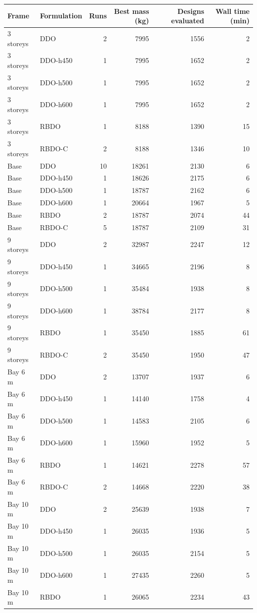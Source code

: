 \begin{tabular}{llrrrr}
\toprule
Frame & Formulation & Runs & Best mass (kg) & Designs evaluated & Wall time (min) \\
\midrule
3 storeys & DDO & 2 & 7995 & 1556 & 2 \\
3 storeys & DDO-h450 & 1 & 7995 & 1652 & 2 \\
3 storeys & DDO-h500 & 1 & 7995 & 1652 & 2 \\
3 storeys & DDO-h600 & 1 & 7995 & 1652 & 2 \\
3 storeys & RBDO & 1 & 8188 & 1390 & 15 \\
3 storeys & RBDO-C & 2 & 8188 & 1346 & 10 \\
Base & DDO & 10 & 18261 & 2130 & 6 \\
Base & DDO-h450 & 1 & 18626 & 2175 & 6 \\
Base & DDO-h500 & 1 & 18787 & 2162 & 6 \\
Base & DDO-h600 & 1 & 20664 & 1967 & 5 \\
Base & RBDO & 2 & 18787 & 2074 & 44 \\
Base & RBDO-C & 5 & 18787 & 2109 & 31 \\
9 storeys & DDO & 2 & 32987 & 2247 & 12 \\
9 storeys & DDO-h450 & 1 & 34665 & 2196 & 8 \\
9 storeys & DDO-h500 & 1 & 35484 & 1938 & 8 \\
9 storeys & DDO-h600 & 1 & 38784 & 2177 & 8 \\
9 storeys & RBDO & 1 & 35450 & 1885 & 61 \\
9 storeys & RBDO-C & 2 & 35450 & 1950 & 47 \\
Bay 6 m & DDO & 2 & 13707 & 1937 & 6 \\
Bay 6 m & DDO-h450 & 1 & 14140 & 1758 & 4 \\
Bay 6 m & DDO-h500 & 1 & 14583 & 2105 & 6 \\
Bay 6 m & DDO-h600 & 1 & 15960 & 1952 & 5 \\
Bay 6 m & RBDO & 1 & 14621 & 2278 & 57 \\
Bay 6 m & RBDO-C & 2 & 14668 & 2220 & 38 \\
Bay 10 m & DDO & 2 & 25639 & 1938 & 7 \\
Bay 10 m & DDO-h450 & 1 & 26035 & 1936 & 5 \\
Bay 10 m & DDO-h500 & 1 & 26035 & 2154 & 5 \\
Bay 10 m & DDO-h600 & 1 & 27435 & 2260 & 5 \\
Bay 10 m & RBDO & 1 & 26065 & 2234 & 43 \\

\end{tabular}

